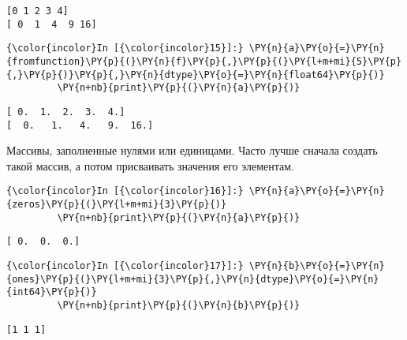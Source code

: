     \begin{Verbatim}[commandchars=\\\{\}]
[0 1 2 3 4]
[ 0  1  4  9 16]

    \end{Verbatim}

    \begin{Verbatim}[commandchars=\\\{\}]
{\color{incolor}In [{\color{incolor}15}]:} \PY{n}{a}\PY{o}{=}\PY{n}{fromfunction}\PY{p}{(}\PY{n}{f}\PY{p}{,}\PY{p}{(}\PY{l+m+mi}{5}\PY{p}{,}\PY{p}{)}\PY{p}{,}\PY{n}{dtype}\PY{o}{=}\PY{n}{float64}\PY{p}{)}
         \PY{n+nb}{print}\PY{p}{(}\PY{n}{a}\PY{p}{)}
\end{Verbatim}

    \begin{Verbatim}[commandchars=\\\{\}]
[ 0.  1.  2.  3.  4.]
[  0.   1.   4.   9.  16.]

    \end{Verbatim}

    Массивы, заполненные нулями или единицами. Часто лучше сначала создать
такой массив, а потом присваивать значения его элементам.

    \begin{Verbatim}[commandchars=\\\{\}]
{\color{incolor}In [{\color{incolor}16}]:} \PY{n}{a}\PY{o}{=}\PY{n}{zeros}\PY{p}{(}\PY{l+m+mi}{3}\PY{p}{)}
         \PY{n+nb}{print}\PY{p}{(}\PY{n}{a}\PY{p}{)}
\end{Verbatim}

    \begin{Verbatim}[commandchars=\\\{\}]
[ 0.  0.  0.]

    \end{Verbatim}

    \begin{Verbatim}[commandchars=\\\{\}]
{\color{incolor}In [{\color{incolor}17}]:} \PY{n}{b}\PY{o}{=}\PY{n}{ones}\PY{p}{(}\PY{l+m+mi}{3}\PY{p}{,}\PY{n}{dtype}\PY{o}{=}\PY{n}{int64}\PY{p}{)}
         \PY{n+nb}{print}\PY{p}{(}\PY{n}{b}\PY{p}{)}
\end{Verbatim}

    \begin{Verbatim}[commandchars=\\\{\}]
[1 1 1]

    \end{Verbatim}

